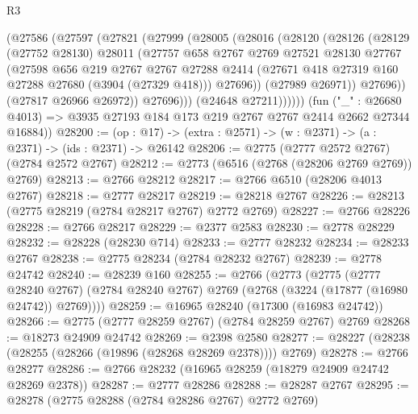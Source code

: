 \begin{lexlean}{R3}
\begin{coremodule}
            (@27586
              (@27597
                (@27821
                  (@27999
                    (@28005
                      (@28016
                        (@28120
                          (@28126
                            (@28129
                              (@27752 @28130)
                              @28011
                              (@27757
                                @658
                                @2767
                                @2769
                                @27521
                                @28130
                                @27767
                                (@27598
                                  @656
                                  @219
                                  @2767
                                  @2767
                                  @27288
                                  @2414
                                  (@27671 @418 @27319 @160 @27288 @27680 (@3904 (@27329 @418)))
                                  @27696))
                              (@27989 @26971))
                            @27696))
                        (@27817 @26966 @26972))
                      @27696)))
                (@24648 @27211))))))
      (fun ("_" : @26680 @4013) =>
      @3935 @27193 @184 @173 @219 @2767 @2767 @2414 @2662 @27344 @16884))
@28200 := (op : @17) -> (extra : @2571) -> (w : @2371) -> (a : @2371) -> (ids : @2371) -> @26142
@28206 := @2775 (@2777 @2572 @2767) (@2784 @2572 @2767)
@28212 := @2773 (@6516 (@2768 (@28206 @2769 @2769)) @2769)
@28213 := @2766 @28212
@28217 := @2766 @6510 (@28206 @4013 @2767)
@28218 := @2777 @28217
@28219 := @28218 @2767
@28226 := @28213 (@2775 @28219 (@2784 @28217 @2767) @2772 @2769)
@28227 := @2766 @28226
@28228 := @2766 @28217
@28229 := @2377 @2583
@28230 := @2778 @28229
@28232 := @28228 (@28230 @714)
@28233 := @2777 @28232
@28234 := @28233 @2767
@28238 := @2775 @28234 (@2784 @28232 @2767)
@28239 := @2778 @24742
@28240 := @28239 @160
@28255 := @2766
    (@2773
      (@2775
        (@2777 @28240 @2767)
        (@2784 @28240 @2767)
        @2769
        (@2768 (@3224 (@17877 (@16980 @24742)) @2769))))
@28259 := @16965 @28240 (@17300 (@16983 @24742))
@28266 := @2775 (@2777 @28259 @2767) (@2784 @28259 @2767) @2769
@28268 := @18273 @24909 @24742
@28269 := @2398 @2580
@28277 := @28227 (@28238 (@28255 (@28266 (@19896 (@28268 @28269 @2378)))) @2769)
@28278 := @2766 @28277
@28286 := @2766 @28232 (@16965 @28259 (@18279 @24909 @24742 @28269 @2378))
@28287 := @2777 @28286
@28288 := @28287 @2767
@28295 := @28278 (@2775 @28288 (@2784 @28286 @2767) @2772 @2769)

\end{coremodule}
\end{lexlean}
